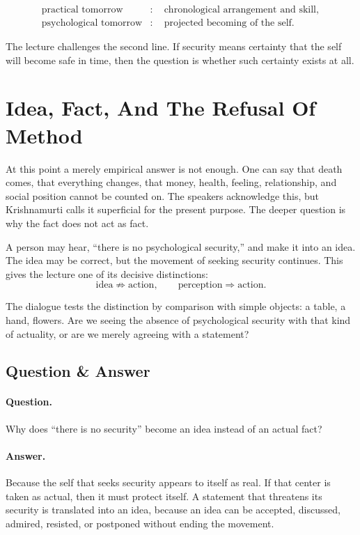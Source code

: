 \documentclass[11pt,oneside]{book}
\begin{document}
\begin{align}
\text{practical tomorrow}
&:\quad
\text{chronological arrangement and skill},\\
\text{psychological tomorrow}
&:\quad
\text{projected becoming of the self}.
\end{align}

The lecture challenges the second line. If security means certainty that the self will become safe in time, then the question is whether such certainty exists at all.

\section{Idea, Fact, And The Refusal Of Method}

At this point a merely empirical answer is not enough. One can say that death comes, that everything changes, that money, health, feeling, relationship, and social position cannot be counted on. The speakers acknowledge this, but Krishnamurti calls it superficial for the present purpose. The deeper question is why the fact does not act as fact.

A person may hear, ``there is no psychological security,'' and make it into an idea. The idea may be correct, but the movement of seeking security continues. This gives the lecture one of its decisive distinctions:
\begin{equation}
\text{idea} \not\Rightarrow \text{action},
\qquad
\text{perception} \Rightarrow \text{action}.
\end{equation}

The dialogue tests the distinction by comparison with simple objects: a table, a hand, flowers. Are we seeing the absence of psychological security with that kind of actuality, or are we merely agreeing with a statement?

\subsection{Question \& Answer}

\paragraph{Question.}
Why does ``there is no security'' become an idea instead of an actual fact?

\paragraph{Answer.}
Because the self that seeks security appears to itself as real. If that center is taken as actual, then it must protect itself. A statement that threatens its security is translated into an idea, because an idea can be accepted, discussed, admired, resisted, or postponed without ending the movement.
\end{document}
